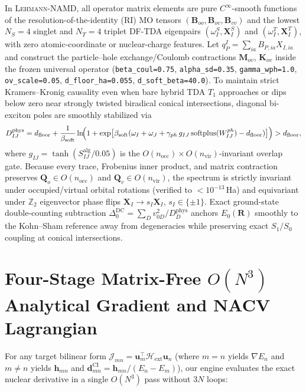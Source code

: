 \documentclass[10pt]{article}
\theoremstyle{natthm}
\newcommand{\leh}{\textsc{Lehmann-NAMD}}
\newcommand{\Hext}{\mathcal{H}_{\mathrm{ext}}}
\begin{document}
In \leh{}, all operator matrix elements are pure $C^\infty$-smooth functions of the resolution-of-the-identity (RI) MO tensors $(\mathbf{B}_{oo}, \mathbf{B}_{ov}, \mathbf{B}_{vv})$ and the lowest $N_S=4$ singlet and $N_T=4$ triplet DF-TDA eigenpairs $(\omega_I^S, \mathbf{X}_I^S)$ and $(\omega_I^T, \mathbf{X}_I^T)$, with zero atomic-coordinate or nuclear-charge features.
Let $q_P^I = \sum_{ia} B_{P,ia} X_{I,ia}$ and construct the particle--hole exchange/Coulomb contractions $\mathbf{M}_{ov}$, $\mathbf{K}_{ov}$ inside the frozen universal operator (\texttt{beta\_coul=0.75}, \texttt{alpha\_sd=0.35}, \texttt{gamma\_wph=1.0}, \texttt{ov\_scale=0.05}, \texttt{d\_floor\_ha=0.055}, \texttt{d\_soft\_beta=40.0}).
To maintain strict Kramers--Kronig causality even when bare hybrid TDA $T_1$ approaches or dips below zero near strongly twisted biradical conical intersections, diagonal bi-exciton poles are smoothly stabilized via
\begin{equation}
  D_{IJ}^{\mathrm{phys}} = d_{\mathrm{floor}} + \frac{1}{\beta_{\mathrm{soft}}}\ln\!\Bigl(1 + \exp\bigl[\beta_{\mathrm{soft}}(\omega_I + \omega_J + \gamma_{ph}\,g_{IJ}\,\mathrm{softplus}(W_{IJ}^{ph}) - d_{\mathrm{floor}})\bigr]\Bigr) > d_{\mathrm{floor}},
\end{equation}
where $g_{IJ} = \tanh(S_{IJ}^{\mathrm{alg}} / 0.05)$ is the $O(n_{\mathrm{occ}})\times O(n_{\mathrm{vir}})$-invariant overlap gate.
Because every trace, Frobenius inner product, and matrix contraction preserves $\mathbf{Q}_o\in O(n_{\mathrm{occ}})$ and $\mathbf{Q}_v\in O(n_{\mathrm{vir}})$, the spectrum is strictly invariant under occupied/virtual orbital rotations (verified to $<10^{-13}$\,Ha) and equivariant under $\mathbb{Z}_2$ eigenvector phase flips $\mathbf{X}_I \to s_I\mathbf{X}_I$, $s_I \in \{\pm 1\}$.
Exact ground-state double-counting subtraction $\Delta_0^{\mathrm{DC}} = \sum_D v_{0D}^2 / D_D^{\mathrm{phys}}$ anchors $E_0(\mathbf{R})$ smoothly to the Kohn--Sham reference away from degeneracies while preserving exact $S_1/S_0$ coupling at conical intersections.

\section{Four-Stage Matrix-Free \texorpdfstring{$O(N^3)$}{O(N3)} Analytical Gradient and NACV Lagrangian}

For any target bilinear form $\mathcal{J}_{mn} = \mathbf{u}_m^\top \Hext \mathbf{u}_n$ (where $m=n$ yields $\nabla E_n$ and $m\ne n$ yields $\mathbf{h}_{mn}$ and $\mathbf{d}_{mn}^{\mathrm{CI}} = \mathbf{h}_{mn}/(E_n-E_m)$), our engine evaluates the exact nuclear derivative in a single $O(N^3)$ pass without $3N$ loops:
\end{document}
